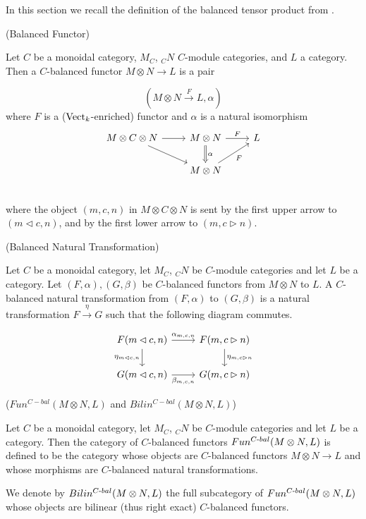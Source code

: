 \noindent In this section we recall the definition of the balanced tensor product
from \cite{douglas/balanced-product}.

\begin{definition} (Balanced Functor)

  \noindent Let $C$ be a monoidal category, $M_{C}$, $_{C}N$ $C$-module
  categories, and $L$ a category. \quad Then a $C$-balanced functor $M \otimes
  N\to L$ is a pair

  \[(M \otimes N \xrightarrow{F} L, \alpha)\]
  where $F$ is a ($\operatorname{Vect}_k$-enriched) functor and $\alpha$ is a natural isomorphism
  \[
    \begin{tikzcd}
      M \otimes C \otimes N \arrow[r] \arrow[dr] &
      M \otimes N \arrow[d, Rightarrow, "\alpha"] \arrow[r, "F"] &
      L \\
      & M \otimes N \arrow[ur, "F"'] \\
    \end{tikzcd}
  \]
  where the object $(m,c,n)$ in $M \otimes C \otimes N$ is sent by the first
  upper arrow to $(m \lhd c, n)$, and by the first lower arrow to $(m, c \rhd n)$.
\end{definition}

\begin{definition} (Balanced Natural Transformation)

  \noindent Let $C$ be a monoidal category, let $M_{C}$, $_{C}N$ be $C$-module
  categories and let $L$ be a category. Let $(F,\alpha), (G,\beta)$ be
  $C$-balanced functors from $M \otimes N$ to $L$. A $C$-balanced natural
  transformation from $(F,\alpha)$ to $(G,\beta)$ is a natural transformation
  $ F \xrightarrow{\eta} G$ such that the following diagram commutes.

  \[
    \begin{tikzcd}
      F(m \lhd c, n) \arrow[r, "\alpha_{m,c,n}"] \arrow[d, "\eta_{m \lhd c, n}"'] &
      F(m, c \rhd n) \arrow[d, "\eta_{m, c \rhd n}"] \\
      G(m \lhd c, n) \arrow[r, "\beta_{m,c,n}"'] &
      G(m, c \rhd n)
    \end{tikzcd}
  \]
\end{definition}

\begin{definition} ($Fun^{C-bal}(M \otimes N, L)$ and $Bilin^{C-bal}(M \otimes N, L)$)

  \noindent Let $C$ be a monoidal category, let $M_{C}$, $_{C}N$ be $C$-module
  categories and let $L$ be a category. \quad Then the category of
  $C$-balanced functors $Fun^{C{\text -}bal}(M \otimes N, L)$ is defined to be
  the category whose objects are $C$-balanced functors $M \otimes N \to L$ and
  whose morphisms are $C$-balanced natural transformations.

  We denote by $Bilin^{C{\text -}bal}(M \otimes N, L)$ the full subcategory of
  $Fun^{C{\text -}bal}(M \otimes N, L)$ whose objects are bilinear (thus right
  exact) $C$-balanced functors.
\end{definition}

